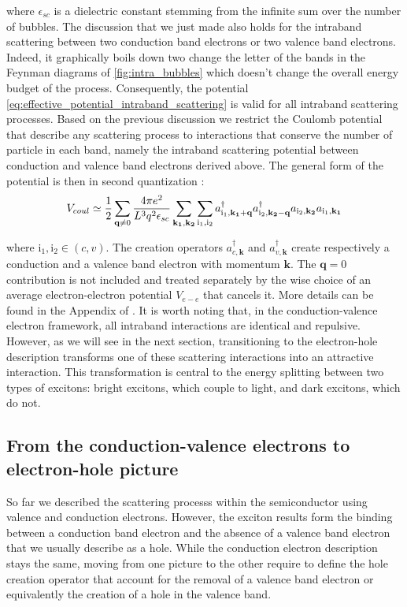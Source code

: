 where $\epsilon_{sc}$ is a dielectric constant stemming from the infinite sum over the number of bubbles. The discussion that we just made also holds for the intraband scattering between two conduction band electrons or two valence band electrons.
Indeed, it graphically boils down two change the letter of the bands in the Feynman diagrams of \autoref{fig:intra_bubbles} which doesn't change the overall energy budget of the process. Consequently, the potential \eqref{eq:effective_potential_intraband_scattering} is valid for all intraband scattering processes.
Based on the previous discussion we restrict the Coulomb potential that describe any scattering process to interactions that conserve the number of particle in each band, namely the intraband scattering potential between conduction and valence band electrons derived above.
The general form of the potential is then in second quantization :
\begin{equation}
    V_{coul}\simeq \dfrac{1}{2}\sum_{\textbf{q}\neq 0}\dfrac{4\pi e^2}{L^3q^2\epsilon_{sc}}\sum_{\mathbf{k_{1}, k_{2}}}\sum_{\mathrm{i_1,i_2}} a^{\dagger}_{\mathrm{i_{1}},\mathbf{k_1+q}}a^{\dagger}_{\mathrm{i_{2}},\mathbf{k_2-q}}a_{\mathrm{i_{2}},\mathbf{k_2}}a_{\mathrm{i_{1}},\mathbf{k_1}}
\end{equation}

\noindent where $\mathrm{i_1,i_2} \in (c,v)$. The creation operators $a^{\dagger}_{c,\mathbf{k}}$ and $a^{\dagger}_{v,\mathbf{k}}$ create respectively a conduction and a valence band electron with momentum $\mathbf{k}$.
The $\textbf{q}=0$ contribution is not included and treated separately by the wise choice of an average electron-electron potential $V_{e-e}$ that cancels it. More details can be found in the Appendix of \cite{Combescot_cooper_excitons_2015}.
It is worth noting that, in the conduction-valence electron framework, all intraband interactions are identical and repulsive. However, as we will see in the next section, transitioning to the electron-hole description transforms one of these scattering interactions into an attractive interaction.
 This transformation is central to the energy splitting between two types of excitons: bright excitons, which couple to light, and dark excitons, which do not.

\subsection{From the conduction-valence electrons to electron-hole picture}

So far we described the scattering processs within the semiconductor using valence and conduction electrons. However, the exciton results form the binding between a conduction band electron and the absence of a valence band electron that we usually describe as a hole.
While the conduction electron description stays the same, moving from one picture to the other require to define the hole creation operator that account for the removal of a valence band electron or equivalently the creation of a hole in the valence band.

